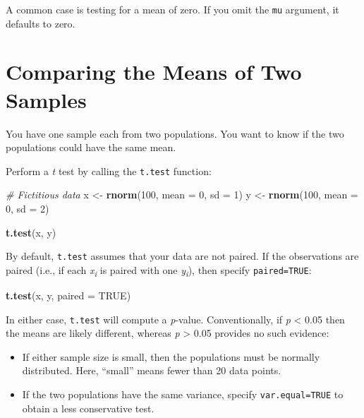 \documentclass[
]{book}
\newenvironment{Shaded}{\begin{snugshade}}{\end{snugshade}}
\newcommand{\CommentTok}[1]{\textcolor[rgb]{0.56,0.35,0.01}{\textit{#1}}}
\newcommand{\DataTypeTok}[1]{\textcolor[rgb]{0.13,0.29,0.53}{#1}}
\newcommand{\DecValTok}[1]{\textcolor[rgb]{0.00,0.00,0.81}{#1}}
\newcommand{\KeywordTok}[1]{\textcolor[rgb]{0.13,0.29,0.53}{\textbf{#1}}}
\newcommand{\NormalTok}[1]{#1}
\newcommand{\OtherTok}[1]{\textcolor[rgb]{0.56,0.35,0.01}{#1}}
\newcommand{\StringTok}[1]{\textcolor[rgb]{0.31,0.60,0.02}{#1}}
\begin{document}
A common case is testing for a mean of zero. If you omit the \texttt{mu}
argument, it defaults to zero.

\hypertarget{comparing-the-means-of-two-samples}{%
\section{Comparing the Means of Two Samples}\label{comparing-the-means-of-two-samples}}

You have one sample each from two populations. You want to know if the
two populations could have the same mean.

Perform a \emph{t} test by calling the \texttt{t.test} function:

\begin{Shaded}
\begin{Highlighting}[]
\CommentTok{# Fictitious data}
\NormalTok{x <-}\StringTok{ }\KeywordTok{rnorm}\NormalTok{(}\DecValTok{100}\NormalTok{, }\DataTypeTok{mean =} \DecValTok{0}\NormalTok{, }\DataTypeTok{sd =} \DecValTok{1}\NormalTok{)}
\NormalTok{y <-}\StringTok{ }\KeywordTok{rnorm}\NormalTok{(}\DecValTok{100}\NormalTok{, }\DataTypeTok{mean =} \DecValTok{0}\NormalTok{, }\DataTypeTok{sd =} \DecValTok{2}\NormalTok{)}

\KeywordTok{t.test}\NormalTok{(x, y)}
\end{Highlighting}
\end{Shaded}

By default, \texttt{t.test} assumes that your data are not paired. If the
observations are paired (i.e., if each \emph{x\textsubscript{i}} is paired with one
\emph{y\textsubscript{i}}), then specify \texttt{paired=TRUE}:

\begin{Shaded}
\begin{Highlighting}[]
\KeywordTok{t.test}\NormalTok{(x, y, }\DataTypeTok{paired =} \OtherTok{TRUE}\NormalTok{)}
\end{Highlighting}
\end{Shaded}

In either case, \texttt{t.test} will compute a \emph{p}-value. Conventionally, if
\emph{p} \textless{} 0.05 then the means are likely different, whereas \emph{p} \textgreater{} 0.05
provides no such evidence:

\begin{itemize}
\item
  If either sample size is small, then the populations must be
  normally distributed. Here, ``small'' means fewer than 20 data points.
\item
  If the two populations have the same variance, specify
  \texttt{var.equal=TRUE} to obtain a less conservative test.
\end{itemize}
\end{document}

